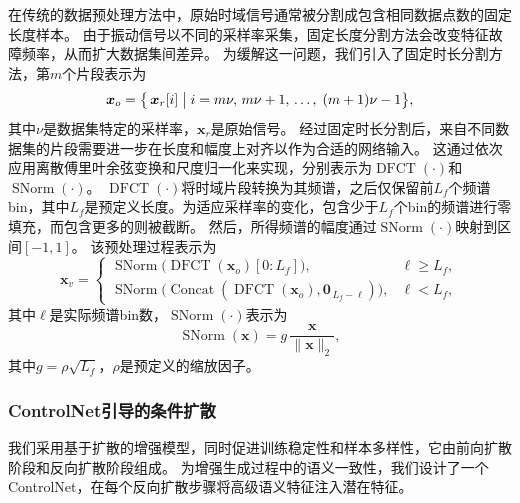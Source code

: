 \documentclass[UTF8,lettersize,journal]{IEEEtran}
\begin{document}
在传统的数据预处理方法中，原始时域信号通常被分割成包含相同数据点数的固定长度样本。
由于振动信号以不同的采样率采集，固定长度分割方法会改变特征故障频率，从而扩大数据集间差异。
为缓解这一问题，我们引入了固定时长分割方法，第$m$个片段表示为
\begin{equation}
\bm{x}_o = \bigl\{\, \bm{x}_r[i] \bigm| i = m\nu,\, m\nu+1,\, \dots,\; (m+1)\nu - 1 \bigr\},
\end{equation}
其中$\nu$是数据集特定的采样率，$\bm{x}_r$是原始信号。
经过固定时长分割后，来自不同数据集的片段需要进一步在长度和幅度上对齐以作为合适的网络输入。
这通过依次应用离散傅里叶余弦变换和尺度归一化来实现，分别表示为$\operatorname{DFCT}(\cdot)$和$\operatorname{SNorm}(\cdot)$。
$\operatorname{DFCT}(\cdot)$将时域片段转换为其频谱，之后仅保留前$L_{f}$个频谱bin，其中$L_{f}$是预定义长度。为适应采样率的变化，包含少于$L_{f}$个bin的频谱进行零填充，而包含更多的则被截断。
然后，所得频谱的幅度通过$\operatorname{SNorm}(\cdot)$映射到区间$\left[-1,1\right]$。
该预处理过程表示为
\begin{equation}
	\label{eq:dcn}
	\bm{x}_v =
	\begin{cases}
		\operatorname{SNorm}\bigl(\operatorname{DFCT}(\bm{x}_o)[0:L_{f}]\bigr),      & \ell \ge L_{f},\\[4pt]
		\operatorname{SNorm}\bigl(\operatorname{Concat}(\operatorname{DFCT}(\bm{x}_o),\bm{0}_{\,L_{f}-\ell})\bigr), & \ell < L_{f},
	\end{cases}
\end{equation}
其中$\ell$是实际频谱bin数，$\operatorname{SNorm}(\cdot)$表示为
\begin{equation}
	\label{eq:scalenorm}
	\operatorname{SNorm}(\bm{x})=g\,\frac{\bm{x}}{\lVert \bm{x}\rVert_{2}},
\end{equation}
其中$g=\rho\sqrt{L_{f}}$，$\rho$是预定义的缩放因子。


\subsubsection{ControlNet引导的条件扩散}
我们采用基于扩散的增强模型，同时促进训练稳定性和样本多样性，它由前向扩散阶段和反向扩散阶段组成。
为增强生成过程中的语义一致性，我们设计了一个ControlNet，在每个反向扩散步骤将高级语义特征注入潜在特征。
\end{document}
